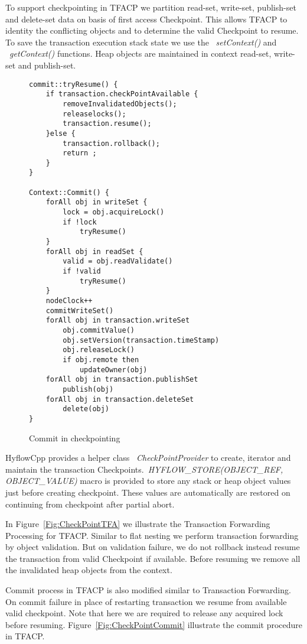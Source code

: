 \documentclass[12pt,english]{report}
\begin{document}
To support checkpointing in TFACP we partition read-set, write-set, publish-set and delete-set data on basis of first access Checkpoint. This allows TFACP to identity the conflicting objects and to determine the valid Checkpoint to resume. To save the transaction execution stack state we use the ~\emph{setContext()} and ~\emph{getContext()} functions. Heap objects are maintained in context read-set, write-set and publish-set. 

\begin{figure}
\begin{minipage}[b]{0.9\linewidth}\centering
\begin{lstlisting}
commit::tryResume() {
	if transaction.checkPointAvailable {
		removeInvalidatedObjects();
		releaselocks();
		transaction.resume();
	}else {
		transaction.rollback();
		return ;
	}		
}

Context::Commit() {
	forAll obj in writeSet {
		lock = obj.acquireLock()
		if !lock
			tryResume()
	}
	forAll obj in readSet {
		valid = obj.readValidate()
		if !valid
			tryResume()
	}
	nodeClock++
	commitWriteSet()
	forAll obj in transaction.writeSet
		obj.commitValue()
 		obj.setVersion(transaction.timeStamp)
 		obj.releaseLock()
 		if obj.remote then
 			updateOwner(obj)
	forAll obj in transaction.publishSet
		publish(obj)
	forAll obj in transaction.deleteSet
		delete(obj)
}
\end{lstlisting}
\end{minipage}
\caption{Commit in checkpointing}
\label{Fig:CheckpointCommit}
\end{figure}

HyflowCpp provides a helper class ~\emph{CheckPointProvider} to create, iterator and maintain the transaction Checkpoints.~\emph{HYFLOW{\_}STORE(OBJECT{\_}REF, OBJECT{\_}VALUE)} macro is provided to store any stack or heap object values just before creating checkpoint. These values are automatically are restored on continuing from checkpoint after partial abort.     

In Figure~\ref{Fig:CheckPointTFA} we illustrate the Transaction Forwarding Processing for TFACP. Similar to flat nesting we perform transaction forwarding by object validation. But on validation failure, we do not rollback instead resume the transaction from valid Checkpoint if available. Before resuming we remove all the invalidated heap objects from the context.

Commit process in TFACP is also modified similar to Transaction Forwarding. On commit failure in place of restarting transaction we resume from available valid checkpoint. Note that here we are required to release any acquired lock before resuming. Figure~\ref{Fig:CheckPointCommit} illustrate the commit procedure in TFACP. 
\end{document}
